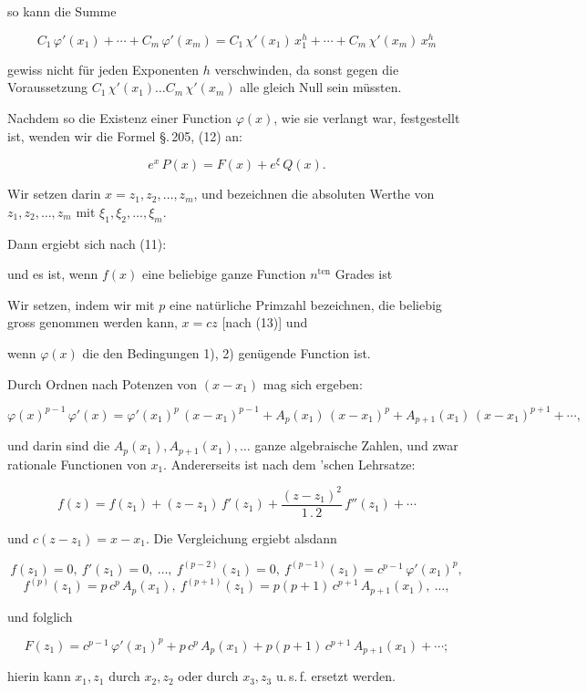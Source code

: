 so kann die Summe

\[
C_1\,\varphi'(x_1)+\cdots+C_m\,\varphi'(x_m) = C_1\,\chi'(x_1)\,x_1^h+\cdots+C_m\,\chi'(x_m)\,x_m^h
\]

gewiss nicht für jeden Exponenten $h$ verschwinden, da sonst gegen die Voraussetzung $C_1\,\chi'(x_1)\ldots C_m\,\chi'(x_m)$ alle gleich Null sein müssten.

Nachdem so die Existenz einer Function $\varphi(x)$, wie sie verlangt war, festgestellt ist, wenden wir die Formel \S.\,205, (12) an:

\[
e^x\,P(x) = F(x) + e^{\xi}\,Q(x).
\]

Wir setzen darin $x=z_1, z_2, \ldots, z_m$, und bezeichnen die absoluten Werthe von $z_1, z_2, \ldots, z_m$ mit $\xi_1, \xi_2, \ldots, \xi_m$.

Dann ergiebt sich nach (11):


und es ist, wenn $f(x)$ eine beliebige ganze Function $n^{\mathrm{ten}}$ Grades ist


Wir setzen, indem wir mit $p$ eine natürliche Primzahl bezeichnen, die beliebig gross genommen werden kann, $x=cz$ [nach (13)] und


wenn $\varphi(x)$ die den Bedingungen 1), 2) genügende Function ist.

Durch Ordnen nach Potenzen von $(x-x_1)$ mag sich ergeben:

\[
\varphi(x)^{p-1}\,\varphi'(x) = \varphi'(x_1)^p\,(x-x_1)^{p-1}+A_p(x_1)\,(x-x_1)^p+A_{p+1}(x_1)\,(x-x_1)^{p+1}+\cdots,
\]

und darin sind die $A_p(x_1), A_{p+1}(x_1), \ldots$ ganze algebraische Zahlen, und zwar rationale Functionen von $x_1$. Andererseits ist nach dem 'schen Lehrsatze:

\[
f(z) = f(z_1)+(z-z_1)\,f'(z_1)+\dfrac{(z-z_1)^2}{1\,.\,2}\,f''(z_1)+\cdots
\]

und $c(z-z_1)=x-x_1$. Die Vergleichung ergiebt alsdann

\[
f(z_1)=0,\ f'(z_1)=0,\ \ldots,\ f^{(p-2)}(z_1)=0,\ f^{(p-1)}(z_1)=c^{p-1}\,\varphi'(x_1)^p,
\]
\[
f^{(p)}(z_1)=p\,c^p\,A_p(x_1),\ f^{(p+1)}(z_1)=p(p+1)\,c^{p+1}\,A_{p+1}(x_1),\ \ldots,
\]

und folglich

\[
F(z_1) = c^{p-1}\,\varphi'(x_1)^p+p\,c^p\,A_p(x_1)+p(p+1)\,c^{p+1}\,A_{p+1}(x_1)+\cdots;
\]

hierin kann $x_1, z_1$ durch $x_2, z_2$ oder durch $x_3, z_3$ u.\,s.\,f. ersetzt werden.

